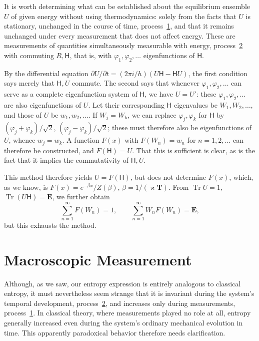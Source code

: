 \documentclass[fontsize=13pt,twoside,openany,headings=normal,parskip=false,bookmarkpackage=false,DIV=calc]{scrbook}
\begin{document}
It is worth determining what can be established about the equilibrium ensemble $U$ of given energy without using thermodynamics: solely from the facts that $U$ is stationary, unchanged in the course of time, process~\hyperref[eq:V.1.1]{1}, and that it remains unchanged under every measurement that does not affect energy. These are measurements of quantities simultaneously measurable with energy, process~\hyperref[eq:V.1.2]{2} with commuting $R,\mathsf{H}$, that is, with $\varphi_1,\varphi_2,\ldots$ eigenfunctions of $\mathsf{H}$.

By the differential equation $\partial U/\partial t=(2\pi i/h)(U\mathsf{H}-\mathsf{H}U)$, the first condition says merely that $\mathsf{H},U$ commute. The second says that whenever $\varphi_1,\varphi_2,\ldots$ can serve as a complete eigenfunction system of $\mathsf{H}$, we have $U=U'$: these $\varphi_1,\varphi_2,\ldots$ are also eigenfunctions of $U$. Let their corresponding $\mathsf{H}$ eigenvalues be $W_1,W_2,\ldots$, and those of $U$ be $w_1,w_2,\ldots$. If $W_j=W_k$, we can replace $\varphi_j,\varphi_k$ for $\mathsf{H}$ by $(\varphi_j+\varphi_k)/\sqrt2$, $(\varphi_j-\varphi_k)/\sqrt2$; these must therefore also be eigenfunctions of $U$, whence $w_j=w_k$. A function $F(x)$ with $F(W_n)=w_n$
\hypertarget{origpage-212}{}%
for $n=1,2,\ldots$ can therefore be constructed, and $F(\mathsf{H})=U$. That this is sufficient is clear, as is the fact that it implies the commutativity of $\mathsf{H},U$.

This method therefore yields $U=F(\mathsf{H})$, but does not determine $F(x)$, which, as we know, is $F(x)=e^{-\beta x}/Z(\beta)$, $\beta=1/(\varkappa\mathbf T)$. From $\operatorname{Tr}U=1$, $\operatorname{Tr}(U\mathsf{H})=\mathbf E$, we further obtain
\[
\sum_{n=1}^{\infty}F(W_n)=1,\qquad
\sum_{n=1}^{\infty}W_nF(W_n)=\mathbf E,
\]
but this exhausts the method.

\section{Macroscopic Measurement}\label{sec:V.4}
Although, as we saw, our entropy expression is entirely analogous to classical entropy, it must nevertheless seem strange that it is invariant during the system's temporal development, process~\hyperref[eq:V.1.2]{2}, and increases only during measurements, process~\hyperref[eq:V.1.1]{1}. In classical theory, where measurements played no role at all, entropy generally increased even during the system's ordinary mechanical evolution in time. This apparently paradoxical behavior therefore needs clarification.
\end{document}
